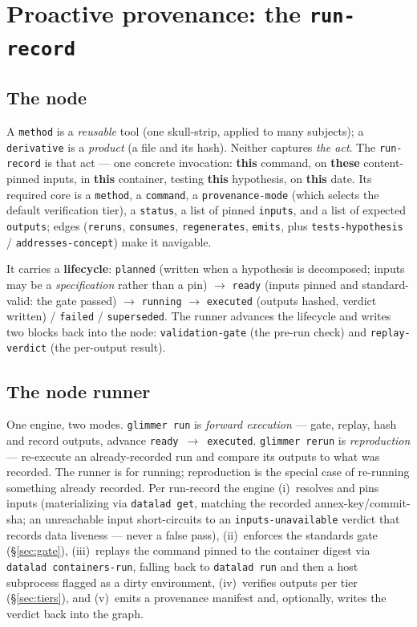 \documentclass[preprint]{glimmer-paper}
\newcommand{\code}[1]{\texttt{#1}}
\begin{document}
\section{Proactive provenance: the \texttt{run-record}}
\label{sec:runrecord}

\subsection{The node}
A \code{method} is a \emph{reusable} tool (one skull-strip, applied to many subjects); a
\code{derivative} is a \emph{product} (a file and its hash). Neither captures \emph{the act}.
The \code{run-record} is that act --- one concrete invocation: \textbf{this} command, on
\textbf{these} content-pinned inputs, in \textbf{this} container, testing \textbf{this}
hypothesis, on \textbf{this} date. Its required core is a \code{method}, a \code{command}, a
\code{provenance-mode} (which selects the default verification tier), a \code{status}, a list
of pinned \code{inputs}, and a list of expected \code{outputs}; edges (\code{reruns},
\code{consumes}, \code{regenerates}, \code{emits}, plus \code{tests-hypothesis} /
\code{addresses-concept}) make it navigable.

It carries a \textbf{lifecycle}: \code{planned} (written when a hypothesis is decomposed;
inputs may be a \emph{specification} rather than a pin) $\rightarrow$ \code{ready} (inputs
pinned and standard-valid: the gate passed) $\rightarrow$ \code{running} $\rightarrow$
\code{executed} (outputs hashed, verdict written) / \code{failed} / \code{superseded}. The
runner advances the lifecycle and writes two blocks back into the node: \code{validation-gate}
(the pre-run check) and \code{replay-verdict} (the per-output result).

\subsection{The node runner}
One engine, two modes. \code{glimmer run} is \emph{forward execution} --- gate, replay, hash
and record outputs, advance \code{ready}~$\rightarrow$~\code{executed}. \code{glimmer rerun}
is \emph{reproduction} --- re-execute an already-recorded run and compare its outputs to what
was recorded. The runner is for running; reproduction is the special case of re-running
something already recorded. Per run-record the engine (i)~resolves and pins inputs
(materializing via \code{datalad get}, matching the recorded annex-key/commit-sha; an
unreachable input short-circuits to an \code{inputs-unavailable} verdict that records data
liveness --- never a false pass), (ii)~enforces the standards gate (\S\ref{sec:gate}),
(iii)~replays the command pinned to the container digest via \code{datalad containers-run},
falling back to \code{datalad run} and then a host subprocess flagged as a dirty environment,
(iv)~verifies outputs per tier (\S\ref{sec:tiers}), and (v)~emits a provenance manifest and,
optionally, writes the verdict back into the graph.
\end{document}
